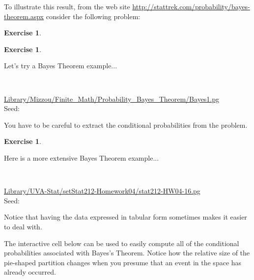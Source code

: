 \documentclass[10pt,]{book}
\theoremstyle{plain}
\theoremstyle{definition}
\theoremstyle{definition}
\theoremstyle{definition}
\newtheorem{exercise}[theorem]{Exercise}
\numberwithin{equation}{section}
\begin{document}
	To illustrate this result, from the web site \url{http://stattrek.com/probability/bayes-theorem.aspx} consider the following problem:
\begin{exercise}\label{exercise-9}
\end{exercise}
\begin{exercise}\label{exercise-10}

	Let's try a Bayes Theorem example...
\par\medskip
\mbox{}\\ %
\begin{mdframed}
{}\par\vspace*{2ex}%
{\tiny\ttfamily\noindent\url{Library/Mizzou/Finite_Math/Probability_Bayes_Theorem/Bayes1.pg}\\Seed: \hfill}\end{mdframed}
\medskip\noindent 
	You have to be careful to extract the conditional probabilities from the problem.
\par
\end{exercise}
\begin{exercise}\label{exercise-11}

	Here is a more extensive Bayes Theorem example...
\par\medskip
\mbox{}\\ %
\begin{mdframed}
{}\par\vspace*{2ex}%
{\tiny\ttfamily\noindent\url{Library/UVA-Stat/setStat212-Homework04/stat212-HW04-16.pg}\\Seed: \hfill}\end{mdframed}
\medskip\noindent 
	Notice that having the data expressed in tabular form sometimes makes it easier to deal with.
\par
\end{exercise}
\par
The interactive cell below can be used to easily compute all of the conditional probabilities associated with Bayes's Theorem. Notice how the relative size of the pie-shaped partition changes when you presume that an event in the space has already occurred.%
\end{document}
